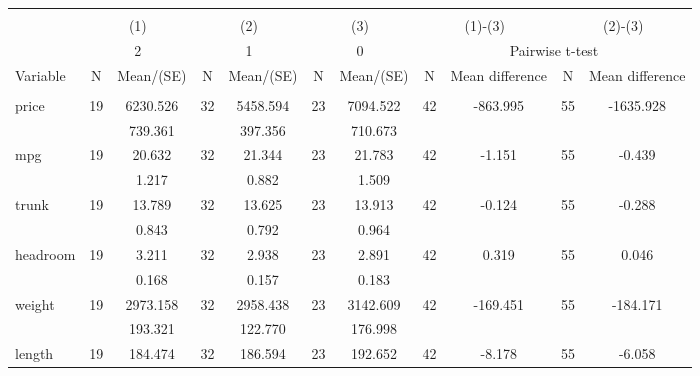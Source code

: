 
\begin{tabular}{@{\extracolsep{5pt}}lcccccccccc}
\\[-1.8ex]\hline \hline \\[-1.8ex]
 & \multicolumn{2}{c}{(1)}  & \multicolumn{2}{c}{(2)}  & \multicolumn{2}{c}{(3)}  & \multicolumn{2}{c}{(1)-(3)} & \multicolumn{2}{c}{(2)-(3)} \\
 & \multicolumn{2}{c}{2}  & \multicolumn{2}{c}{1}  & \multicolumn{2}{c}{0}  & \multicolumn{4}{c}{Pairwise t-test}  \\
Variable & N & Mean/(SE) & N & Mean/(SE) & N & Mean/(SE) & N & Mean difference & N & Mean difference \\ \hline \\[-1.8ex] 
price   & 19    &  6230.526    & 32    &  5458.594    & 23    &  7094.522    & 42    &  -863.995    & 55    & -1635.928   \\
 &   &   739.361  &   &   397.356  &   &   710.673  &   &  &   &   \\
mpg   & 19    &    20.632    & 32    &    21.344    & 23    &    21.783    & 42    &    -1.151    & 55    &    -0.439   \\
 &   &     1.217  &   &     0.882  &   &     1.509  &   &  &   &   \\
trunk   & 19    &    13.789    & 32    &    13.625    & 23    &    13.913    & 42    &    -0.124    & 55    &    -0.288   \\
 &   &     0.843  &   &     0.792  &   &     0.964  &   &  &   &   \\
headroom   & 19    &     3.211    & 32    &     2.938    & 23    &     2.891    & 42    &     0.319    & 55    &     0.046   \\
 &   &     0.168  &   &     0.157  &   &     0.183  &   &  &   &   \\
weight   & 19    &  2973.158    & 32    &  2958.438    & 23    &  3142.609    & 42    &  -169.451    & 55    &  -184.171   \\
 &   &   193.321  &   &   122.770  &   &   176.998  &   &  &   &   \\
length   & 19    &   184.474    & 32    &   186.594    & 23    &   192.652    & 42    &    -8.178    & 55    &    -6.058   \\

\end{tabular}
